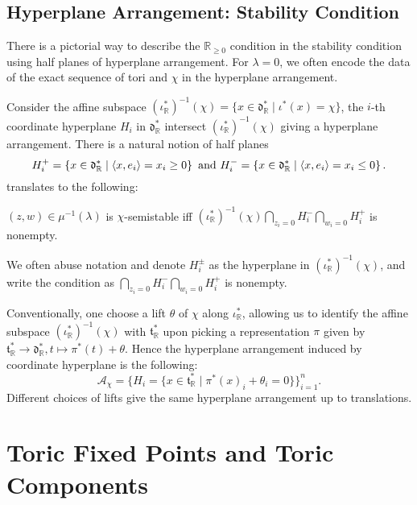 \documentclass[b5paper]{article}
\begin{document}
\subsection{Hyperplane Arrangement: Stability Condition}

There is a pictorial way to describe the $\mathbb{R}_{\geq 0}$ condition in the stability condition using half planes of hyperplane arrangement.
For $\lambda=0$, we often encode the data of the exact sequence of tori and $\chi$ in the hyperplane arrangement. 

Consider the affine subspace $ (\iota_{\mathbb{R}}^*)^{-1}(\chi) = \{ x \in \mathfrak{d}_{\mathbb{R}}^* \mid \iota^*(x) = \chi \} $, the $i$-th coordinate hyperplane $H_i$ in $\mathfrak{d}_\mathbb{R}^*$ intersect $(\iota_{\mathbb{R}}^*)^{-1}(\chi)$ giving a hyperplane arrangement. There is a natural notion of half planes 
\[
H_i^+=\left\{x\in \mathfrak{d}^*_\mathbb{R}\mid \langle x,e_i\rangle=x_i\geq 0\right\}
\textnormal{ and }
H_i^-=\left\{x\in \mathfrak{d}^*_\mathbb{R}\mid \langle x,e_i\rangle=x_i\leq 0\right\}.
\]
 translates to the following:

\begin{lemma}[lem:]{}
  $(z,w)\in \mu^{-1}(\lambda)$ is $\chi$-semistable iff $(\iota_{\mathbb{R}}^*)^{-1}(\chi)\bigcap _{z_i=0}H_i^-\bigcap _{w_i=0}H_i^+$ is nonempty. 
  \begin{remark}
    We often abuse notation and denote $H_i^{\pm}$ as the hyperplane in $(\iota^*_{\mathbb{R}})^{-1}(\chi)$, and write the condition as $\bigcap _{z_i=0}H_i^-\bigcap _{w_i=0}H_i^+$ is nonempty. 
  \end{remark}
\end{lemma}

Conventionally, one choose a lift $\theta$ of $\chi$ along $\iota_\mathbb{R}^*$, allowing us to identify the affine subspace $(\iota_{\mathbb{R}}^*)^{-1}(\chi)$ with $\mathfrak{t}_\mathbb{R}^*$ upon picking a representation $\pi$ given by $\mathfrak{t}^*_\mathbb{R}\rightarrow \mathfrak{d}_\mathbb{R}^*, t\mapsto \pi^*(t)+\theta$. Hence the hyperplane arrangement induced by coordinate hyperplane is the following:
\begin{equation*}
    \mathcal{A}_\chi = \{ H_i = \{ x \in \mathfrak{t}_{\mathbb{R}}^* \mid \pi^*(x)_i + \theta_i = 0\} \}_{i=1}^n.
\end{equation*}
Different choices of lifts give the same hyperplane arrangement up to translations.

\section{Toric Fixed Points and Toric Components}
\end{document}
